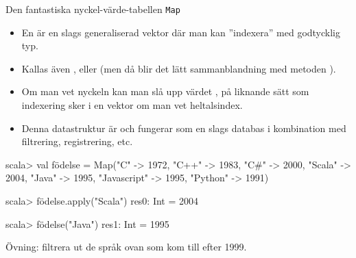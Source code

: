 \begin{Slide}{Den fantastiska nyckel-värde-tabellen \texttt{Map}}\SlideFontSmall
\begin{itemize}
\item En   är en slags generaliserad vektor där man kan ''indexera'' med godtycklig typ.

\item Kallas även \href{https://sv.wikipedia.org/wiki/Hashtabell}{} ,   eller   (men då blir det lätt sammanblandning med metoden ).

\item Om man vet nyckeln kan man slå upp värdet , på liknande sätt som indexering sker i en vektor om man vet heltalsindex.

\item Denna datastruktur är  och fungerar som en slags databas i kombination med filtrering, registrering, etc.
\end{itemize}
\begin{REPL}
scala> val födelse = Map("C" -> 1972,  "C++" -> 1983, "C#" -> 2000,
  "Scala" -> 2004, "Java" -> 1995, "Javascript" -> 1995, "Python" -> 1991)

scala> födelse.apply("Scala")
res0: Int = 2004

scala> födelse("Java")
res1: Int = 1995
\end{REPL}
Övning: filtrera ut de språk ovan som kom till efter 1999.
\end{Slide}

